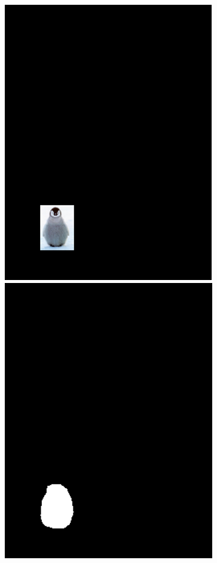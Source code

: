 \documentclass[11pt]{article}
\begin{document}
\begin{figure} [ht]
\begin{center}
\includegraphics[scale=0.44]{results_poisson/set1/im3.png}  
\includegraphics[scale=0.44]{results_poisson/set1/im4.png} 

\end{center}
\end{figure}
\end{document}
